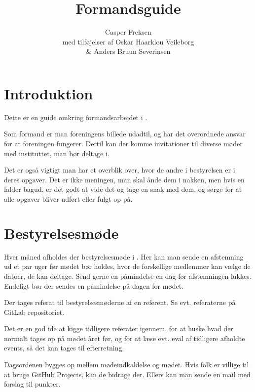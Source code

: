 

\title{Formandsguide}
\date{}
\author{Casper Freksen\\
\small med tilføjelser af Oskar Haarklou Veileborg\\
\small \& Anders Bruun Severinsen}



\maketitle

\section{Introduktion}
\label{sec:introduktion}

Dette er en guide omkring formandsarbejdet i \fredagscafeen.

Som formand er man foreningens billede udadtil, og har det overordnede ansvar for
at foreningen fungerer. 
Dertil kan der komme invitationer til diverse møder med instituttet, man bør deltage i.

Det er også vigtigt man har et overblik over, hvor de andre i
bestyrelsen er i deres opgaver. Det er ikke meningen, man skal ånde
dem i nakken, men hvis en falder bagud, er det godt at vide det og
tage en snak med dem, og sørge for at alle opgaver bliver udført eller fulgt op på.

\section{Bestyrelsesmøde}
\label{sec:bestyrelsesmode}

Hver måned afholdes der bestyrelsesmøde i \fredagscafeen. Her kan
man sende en afstemning ud et par uger før mødet bør holdes, hvor de forskellige medlemmer kan
vælge de datoer, de kan deltage. Send gerne en påmindelse en dag før afstemningen
lukkes. Endeligt bør der sendes en påmindelse på dagen for mødet.

Der tages referat til bestyrelsesmøderne af en referent. Se
evt. referaterne på GitLab repositoriet.

Det er en god ide at kigge tidligere referater igennem, for at huske
hvad der normalt tages op på mødet året før, og for at læse evt. eval
af tidligere afholdte events, så det kan tages til efterretning.

Dagsordenen bygges op mellem mødeindkaldelse og mødet. Hvis folk er
villige til at bruge GitHub Projects, kan de bidrage der. Ellers kan man sende
en mail med forslag til punkter.

